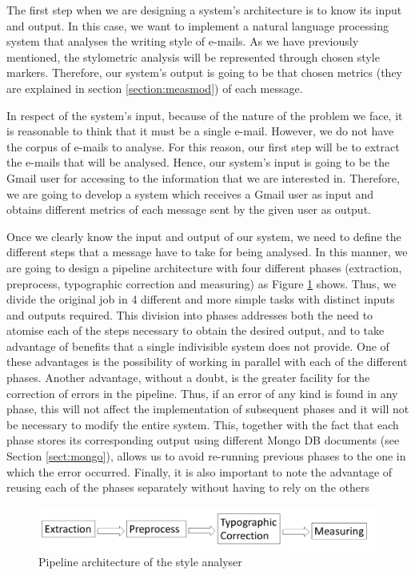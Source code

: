 The first step when we are designing a system's architecture is to know its input and output. In this case, we want to implement a natural language processing system that analyses the writing style of e-mails. As we have previously mentioned, the stylometric analysis will be represented through chosen style markers. Therefore, our system's output is going to be that chosen metrics (they are explained in section \ref{section:measmod}) of each message.

In respect of the system's input, because of the nature of the problem we face, it is reasonable to think that it must be a single e-mail. However, we do not have the corpus of e-mails to analyse. For this reason, our first step will be to extract the e-mails that will be analysed. Hence, our system's input is going to be the Gmail user for accessing to the information that we are interested in. Therefore, we are going to develop a system which receives a Gmail user as input and obtains different metrics of each message sent by the given user as output.

Once we clearly know the input and output of our system, we need to define the different steps that a message have to take for being analysed. In this manner, we are going to design a pipeline architecture with four different phases (extraction, preprocess, typographic correction and measuring) as Figure \ref{fig:arch} shows. Thus, we divide the original job in 4 different and more simple tasks with distinct inputs and outputs required. This division into phases addresses both the need to atomise each of the steps necessary to obtain the desired output, and to take advantage of benefits that a single indivisible system does not provide. One of these advantages is the possibility of working in parallel with each of the different phases. Another advantage, without a doubt, is the greater facility for the correction of errors in the pipeline. Thus, if an error of any kind is found in any phase, this will not affect the implementation of subsequent phases and it will not be necessary to modify the entire system. This, together with the fact that each phase stores its corresponding output using different Mongo DB documents (see Section \ref{sect:mongo}), allows us to avoid re-running previous phases to the one in which the error occurred. Finally, it is also important to note the advantage of reusing each of the phases separately without having to rely on the others

\begin{figure}[h]
	\centering%
	\includegraphics[width = 1\textwidth]{Imagenes/Bitmap/Analyser/architecture.png}%
	\caption{Pipeline architecture of the style analyser}%
	\label{fig:arch}
\end{figure}

